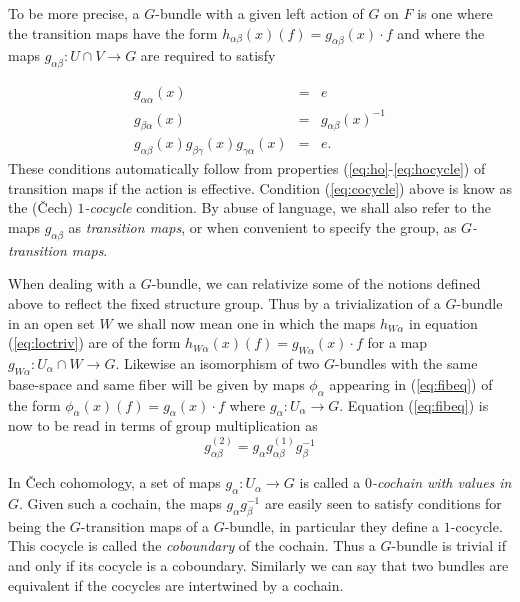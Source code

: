 \documentclass[12pt,titlepage]{article}
\begin{document}
To be more precise,  a \(G\)-bundle with a given left action of
\(G\) on \(F\) is one where the transition maps have the form 
\(h_{\alpha\beta}(x)(f) = g_{\alpha\beta}(x)\cdot f\) and where the maps
\(g_{\alpha\beta}:U\cap V \to
G\)
% 
are required to satisfy

\begin{eqnarray}   \label{eq:co}
g_{\alpha\alpha}(x) &=& e  \\ \label{eq:couv}
g_{\beta\alpha}(x) &=&  g_{\alpha\beta}(x)^{-1}\\ \label{eq:cocycle}
g_{\alpha\beta}(x)g_{\beta\gamma}(x)g_{\gamma\alpha}(x) &=& e.
\end{eqnarray}%
These conditions automatically follow from properties
(\ref{eq:ho}-\ref{eq:hocycle}) of transition maps if the action is
effective.
Condition (\ref{eq:cocycle}) above is know as the (\v{C}ech)
%
 {\em
\(1\)-cocycle}
%
condition. By abuse of language, we shall also refer to the
maps \(g_{\alpha\beta}\) as {\em transition maps\/},
%
 or when convenient
to specify the group, as {\em \(G\)-transition maps\/}.
%

When  dealing with a \(G\)-bundle, we can relativize some of the notions
defined above to reflect the fixed structure group.
Thus by a  trivialization of a \(G\)-bundle
in an open set \(W\) we shall now
mean one in which the maps \(h_{W\alpha}\) in equation 
(\ref{eq:loctriv})  are of the
form \(h_{W\alpha}(x)(f) = g_{W\alpha}(x)\cdot f\) for a map
\(g_{W\alpha}:U_\alpha\cap W \to G\).
% 
Likewise an isomorphism of two
\(G\)-bundles with the same base-space and same
fiber will be given by maps \(\phi_\alpha\) appearing in
(\ref{eq:fibeq}) of the form \(\phi_\alpha(x)(f) = g_\alpha(x)\cdot f\)
where
\(g_\alpha:U_\alpha\to G\). 
%
Equation (\ref{eq:fibeq}) is now to be
read in terms of group multiplication as
\begin{equation}\label{eq:gfibmor}
g^{(2)}_{\alpha\beta}= g_\alpha
g^{(1)}_{\alpha\beta}g_\beta^{-1}
\end{equation}%

 In \v{C}ech cohomology, a
set of maps \(g_\alpha:U_\alpha\to G\) is called a {\em \(0\)-cochain
 with values in
\(G\)\/}.
%
Given such a cochain, the maps
\(g_\alpha g_\beta^{-1}\) are easily seen to satisfy conditions for
being
the \(G\)-transition maps of a \(G\)-bundle, in particular they define a
\(1\)-cocycle. This cocycle is called the {\em coboundary\/}
%
 of the
cochain. Thus a \(G\)-bundle is trivial if and only if its cocycle is a
coboundary. Similarly we can say that two bundles are equivalent if the
cocycles are intertwined by a cochain.
\end{document}
